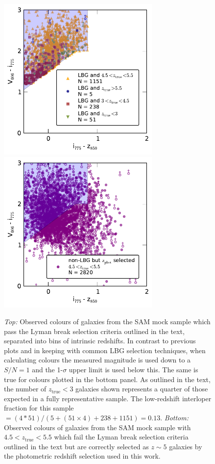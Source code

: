 \begin{figure}
\centering
\includegraphics[width=80mm]{plots/figA3a.pdf}
\includegraphics[width=80mm]{plots/figA3b.pdf}
\caption[Short caption]{\emph{Top:} Observed colours of galaxies from the SAM mock sample which pass the Lyman break selection criteria outlined in the text, separated into bins of intrinsic redshifts. In contrast to previous plots and in keeping with common LBG selection techniques, when calculating colours the measured magnitude is used down to a $S/N = 1$ and the 1-$\sigma$ upper limit is used below this. The same is true for colours plotted in the bottom panel. As outlined in the text, the number of $z_{\text{true}} < 3$ galaxies shown represents a quarter of those expected in a fully representative sample. The low-redshift interloper fraction for this sample $= (4*51) / (5 + (51 \times 4) + 238 + 1151) = 0.13$. \emph{Bottom:} Observed colours of galaxies from the SAM mock sample with $4.5 < z_{\text{true}} < 5.5$ which fail the Lyman break selection criteria outlined in the text but are correctly selected as $z\sim5$ galaxies by the photometric redshift selection used in this work.}
\label{fig:mock_col_LBG}
\end{figure}

